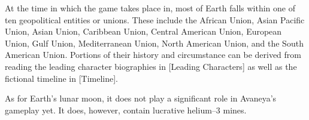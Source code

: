 

At the time in which the game takes place in, most of Earth falls within one of ten geopolitical entities or unions. These include the African Union, Asian Pacific Union, Asian Union, Caribbean Union, Central American Union, European Union, Gulf Union, Mediterranean Union, North American Union, and the South American Union. Portions of their history and circumstance can be derived from reading the leading character biographies in [Leading Characters] as well as the fictional timeline in [Timeline].

As for Earth's lunar moon, it does not play a significant role in Avaneya's gameplay yet. It does, however, contain lucrative helium--3 mines.

